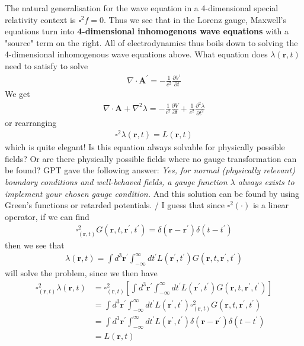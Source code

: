 The natural generalisation for the wave equation in a 4-dimensional special relativity context is \(\square^{2} f = 0\). Thus we see that in the Lorenz gauge, Maxwell's equations turn into \textbf{4-dimensional inhomogenous wave equations} with a "source" term on the right. All of electrodynamics thus boils down to solving the 4-dimensional inhomogenous wave equations above. What equation does \(\lambda (\mathbf{r}, t)\) need to satisfy to solve \begin{align*}
    \nabla \cdot \mathbf{A}^{\prime}  = - \frac{1}{c^{2} }\frac{\partial V^{\prime} }{\partial t} 
\end{align*}
We get \begin{align*}
    \nabla \cdot \mathbf{A} + \nabla ^{2} \lambda = -\frac{1}{c^{2} }\frac{\partial V}{\partial t} + \frac{1}{c^{2} }\frac{\partial^{2}  \lambda }{\partial t^{2} } 
\end{align*}
or rearranging \begin{align*}
    \square ^{2} \lambda(\mathbf{r}, t) = L(\mathbf{r}, t)
\end{align*}
which is quite elegant! Is this equation always solvable for physically possible fields? Or are there physically possible fields where no gauge transformation can be found? GPT gave the following answer: \textit{Yes, for normal (physically relevant) boundary conditions and well-behaved fields, a gauge function \(\lambda\) always exists to implement your chosen gauge condition.} And this solution can be found by using Green's functions or retarded potentials. / I guess that since \(\square^{2} (\cdot )\) is a linear operator, if we can find \begin{align*}
    \square_{(\mathbf{r}, t)}^{2} G(\mathbf{r}, t, \mathbf{r}^{\prime}, t^{\prime} ) = \delta (\mathbf{r} - \mathbf{r}^{\prime} )\delta (t - t^{\prime} )
\end{align*}
then we see that \begin{align*}
    \lambda (\mathbf{r}, t) = \int d^3 \mathbf{r}^{\prime}  \int_{-\infty}^{\infty} dt^{\prime} L(\mathbf{r}^{\prime} , t^{\prime} ) G(\mathbf{r}, t, \mathbf{r}^{\prime}, t^{\prime} )  
\end{align*}
will solve the problem, since we then have\begin{align*}
    \square_{(\mathbf{r}, t)}^{2} \lambda (\mathbf{r}, t) &= \square_{(\mathbf{r}, t)}^{2} \left[ \int d^3 \mathbf{r}^{\prime}  \int_{-\infty}^{\infty} dt^{\prime} L(\mathbf{r}^{\prime} , t^{\prime} ) G(\mathbf{r}, t, \mathbf{r}^{\prime}, t^{\prime} )   \right] \\
    &= \int d^3 \mathbf{r}^{\prime}  \int_{-\infty}^{\infty} dt^{\prime} L(\mathbf{r}^{\prime} , t^{\prime} ) \square_{(\mathbf{r}, t)}^{2} G(\mathbf{r}, t, \mathbf{r}^{\prime}, t^{\prime} ) \\
    &= \int d^3 \mathbf{r}^{\prime}  \int_{-\infty}^{\infty} dt^{\prime} L(\mathbf{r}^{\prime} , t^{\prime} ) \delta (\mathbf{r} - \mathbf{r}^{\prime} )\delta (t - t^{\prime} )\\
    &= L(\mathbf{r}, t)
\end{align*}
